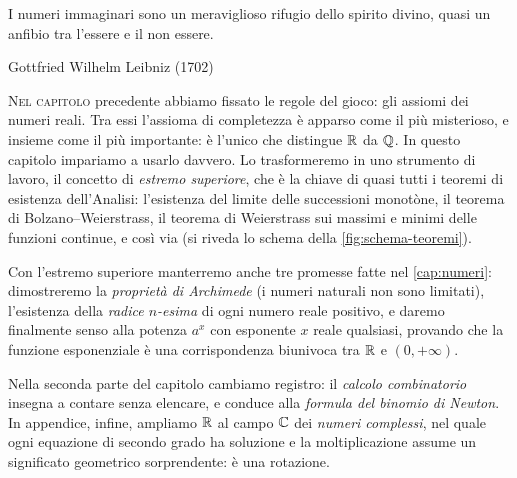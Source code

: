 
\epigraph{I numeri immaginari sono un meraviglioso rifugio dello spirito divino, quasi
un anfibio tra l'essere e il non essere.}{Gottfried Wilhelm Leibniz (1702)}

\lettrine[lines=3, findent=2pt, nindent=0pt]{N}{el capitolo} precedente abbiamo fissato
le regole del gioco: gli assiomi dei numeri reali. Tra essi l'assioma di completezza è
apparso come il più misterioso, e insieme come il più importante: è l'unico che
distingue $\mathbb{R}$ da $\mathbb{Q}$. In questo capitolo impariamo a usarlo davvero. Lo trasformeremo
in uno strumento di lavoro, il concetto di \emph{estremo superiore}, che è la chiave di
quasi tutti i teoremi di esistenza dell'Analisi: l'esistenza del limite delle
successioni monotòne, il teorema di Bolzano--Weierstrass, il teorema di Weierstrass sui
massimi e minimi delle funzioni continue, e così via (si riveda lo schema della
\cref{fig:schema-teoremi}).

Con l'estremo superiore manterremo anche tre promesse fatte nel \cref{cap:numeri}:
dimostreremo la \emph{proprietà di Archimede} (i numeri naturali non sono limitati),
l'esistenza della \emph{radice $n$-esima} di ogni numero reale positivo, e daremo
finalmente senso alla potenza $a^{x}$ con esponente $x$ reale qualsiasi, provando che
la funzione esponenziale è una corrispondenza biunivoca tra $\mathbb{R}$ e $(0,+\infty)$.

Nella seconda parte del capitolo cambiamo registro: il \emph{calcolo combinatorio}
insegna a contare senza elencare, e conduce alla \emph{formula del binomio di Newton}.
In appendice, infine, ampliamo $\mathbb{R}$ al campo $\mathbb{C}$ dei \emph{numeri complessi}, nel quale
ogni equazione di secondo grado ha soluzione e la moltiplicazione assume un significato
geometrico sorprendente: è una rotazione.

